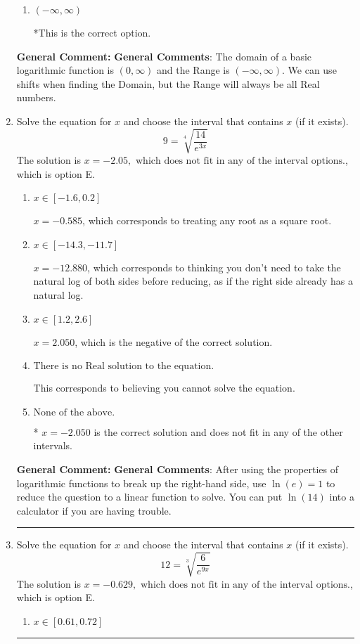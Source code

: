 \documentclass{extbook}[14pt]
\newcommand{\litem}[1]{\item #1

\rule{\textwidth}{0.4pt}}
\begin{document}
\begin{enumerate}
{\begin{enumerate}[label=\Alph*.]
$(-\infty, 3)$, which corresponds to using the using the negative of vertical shift on $(0, \infty)$.
\item \( (-\infty, \infty) \)

*This is the correct option.
\end{enumerate}

\textbf{General Comment:} \textbf{General Comments}: The domain of a basic logarithmic function is $(0, \infty)$ and the Range is $(-\infty, \infty)$. We can use shifts when finding the Domain, but the Range will always be all Real numbers.
}
\litem{
 Solve the equation for $x$ and choose the interval that contains $x$ (if it exists).
\[  9 = \sqrt[4]{\frac{14}{e^{3x}}} \]The solution is \( x = -2.05, \text{ which does not fit in any of the interval options.} \), which is option E.\begin{enumerate}[label=\Alph*.]
\item \( x \in [-1.6, 0.2] \)

$x = -0.585$, which corresponds to treating any root as a square root.
\item \( x \in [-14.3, -11.7] \)

$x = -12.880$, which corresponds to thinking you don't need to take the natural log of both sides before reducing, as if the right side already has a natural log.
\item \( x \in [1.2, 2.6] \)

$x = 2.050$, which is the negative of the correct solution.
\item \( \text{There is no Real solution to the equation.} \)

This corresponds to believing you cannot solve the equation.
\item \( \text{None of the above.} \)

* $x = -2.050$ is the correct solution and does not fit in any of the other intervals.
\end{enumerate}

\textbf{General Comment:} \textbf{General Comments}: After using the properties of logarithmic functions to break up the right-hand side, use $\ln(e) = 1$ to reduce the question to a linear function to solve. You can put $\ln(14)$ into a calculator if you are having trouble.
}
\litem{
 Solve the equation for $x$ and choose the interval that contains $x$ (if it exists).
\[  12 = \sqrt[3]{\frac{6}{e^{9x}}} \]The solution is \( x = -0.629, \text{ which does not fit in any of the interval options.} \), which is option E.\begin{enumerate}[label=\Alph*.]
\item \( x \in [0.61, 0.72] \)


\end{enumerate}}
\end{enumerate}
\end{document}
